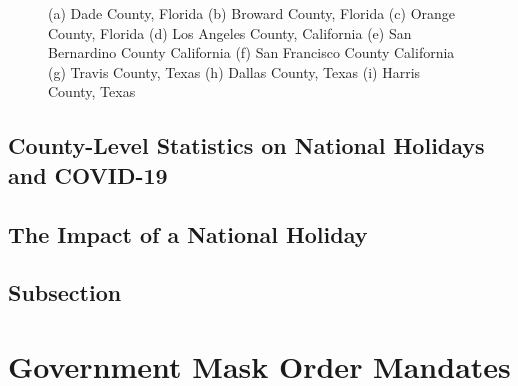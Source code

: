 \documentclass[]{article}
\begin{document}
\begin{figure}
	\caption{(a) Dade County, Florida (b) Broward County, Florida (c) Orange County, Florida (d) Los Angeles County, California (e) San Bernardino County California (f) San Francisco County California (g) Travis County, Texas (h) Dallas County, Texas (i) Harris County, Texas}
	\label{fig:foobar}
\end{figure}

\FloatBarrier
\subsection{County-Level Statistics on National Holidays and COVID-19}
\subsection{The Impact of a National Holiday}
\subsection{Subsection}

\FloatBarrier
\vspace{5mm}
\section{Government Mask Order Mandates}
\end{document}
